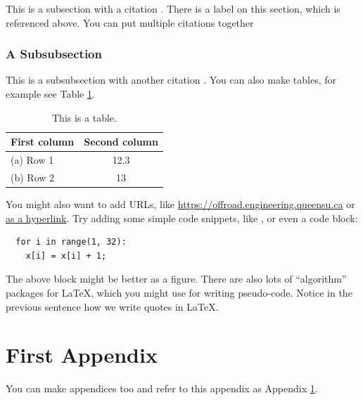 \documentclass[letterpaper,fleqn,oneside]{qu-handout}
\begin{document}
This is a subsection with a citation \cite{Ogata:2001aa}.  There is a label on this section, which is referenced above.  You can put multiple citations together \cite{Marshall:2004aa,Ogata:2001aa}

\subsubsection{A Subsubsection}

This is a subsubsection with another citation \cite[p.\ 1964]{Marshall:2004aa}.  You can also make tables, for example see Table \ref{tbl:example}.

\begin{table}
  \caption{This is a table.}
  \begin{center}
    \begin{tabular}{lc}
      \toprule
      \bf First column & \bf Second column \\ \midrule
      (a) Row 1 & 12.3 \\
      (b) Row 2 & 13 \\
      \bottomrule
    \end{tabular}
  \end{center}
  \label{tbl:example}
\end{table}%

You might also want to add URLs, like \url{https://offroad.engineering.queensu.ca} or \href{https://offroad.engineering.queensu.ca}{as a hyperlink}.  Try adding some simple code snippets, like  , or even a code block:
\begin{verbatim}
  for i in range(1, 32):
    x[i] = x[i] + 1;
\end{verbatim}
The above block might be better as a figure.  There are also lots of ``algorithm'' packages for LaTeX, which you might use for writing pseudo-code.  Notice in the previous sentence how we write quotes in \LaTeX.






\appendix

\section{First Appendix}
\label{sec:appendix}

You can make appendices too and refer to this appendix as Appendix \ref{sec:appendix}.

\end{document}
